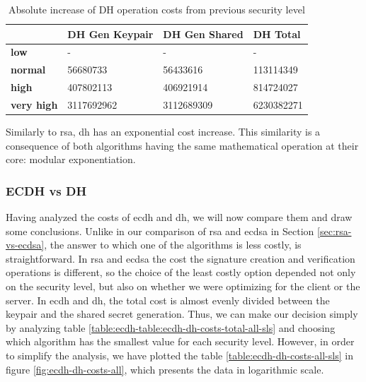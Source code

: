 \documentclass{llncs}
\begin{document}
  \begin{table}[]
    \begin{tabular}{|l|l|l|l|}
    \hline
                       & \textbf{DH Gen Keypair} & \textbf{DH Gen Shared} & \textbf{DH Total} \\ \hline
    \textbf{low}       & -                       & -                      & -                 \\ \hline
    \textbf{normal}    & 56680733                & 56433616               & 113114349         \\ \hline
    \textbf{high}      & 407802113               & 406921914              & 814724027         \\ \hline
    \textbf{very high} & 3117692962              & 3112689309             & 6230382271        \\ \hline
    \end{tabular}
    \centering \caption{\label{table:dh-absolute-cost-increase} Absolute increase of DH operation costs from previous security level}
    \end{table}

Similarly to \gls{rsa}, \gls{dh} has an exponential cost increase. This similarity is a consequence of both algorithms having the same mathematical
operation at their core: modular exponentiation.

\subsubsection{ECDH vs DH}

Having analyzed the costs of \gls{ecdh} and \gls{dh}, we will now compare them and draw some conclusions. Unlike in our comparison of
\gls{rsa} and \gls{ecdsa} in Section \ref{sec:rsa-vs-ecdsa}, the answer to which one of the algorithms is less costly, is straightforward.
In \gls{rsa} and \gls{ecdsa} the cost the signature creation and verification operations is different, so the choice of the least costly
option depended not only on the security level, but also on whether we were optimizing for the client or the server. In \gls{ecdh} and \gls{dh},
the total cost is almost evenly divided between the keypair and the shared secret generation. Thus, we can make our decision simply
by analyzing table \ref{table:ecdh-table:ecdh-dh-costs-total-all-sls} and choosing which algorithm has the smallest value for each security level.
However, in order to simplify the analysis, we have plotted the table \ref{table:ecdh-dh-costs-all-sls} in figure \ref{fig:ecdh-dh-costs-all}, which
presents the data in logarithmic scale.
\end{document}
